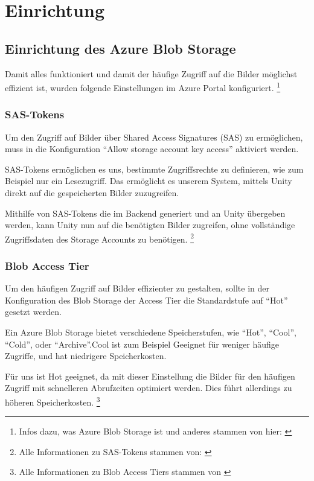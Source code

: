 
\section{Einrichtung}

\subsection{Einrichtung des Azure Blob Storage}

Damit alles funktioniert und damit der häufige Zugriff auf die Bilder
möglichst effizient ist, wurden folgende Einstellungen im Azure Portal
konfiguriert. \footnote{Infos dazu, was Azure Blob Storage ist und anderes stammen von hier: \cite{MicrosoftCorporationd}}

\subsubsection{SAS-Tokens}

Um den Zugriff auf Bilder über Shared Access Signatures (SAS) zu ermöglichen, muss in 
die Konfiguration ``Allow storage account key access'' aktiviert werden.

SAS-Tokens ermöglichen es uns, bestimmte Zugriffsrechte zu definieren, wie zum Beispiel
nur ein Lesezugriff. Das ermöglicht es unserem System, mittels Unity direkt auf die
gespeicherten Bilder zuzugreifen.

Mithilfe von SAS-Tokens die im Backend generiert und an Unity übergeben werden, 
kann Unity nun auf die benötigten Bilder zugreifen, ohne vollständige Zugriffsdaten 
des Storage Accounts zu benötigen. \footnote{Alle Informationen zu SAS-Tokens stammen von: \cite{MicrosoftCorporationa}}


\subsubsection{Blob Access Tier}

Um den häufigen Zugriff auf Bilder effizienter zu gestalten, sollte in der Konfiguration 
des Blob Storage der Access Tier die Standardstufe auf ``Hot'' gesetzt werden.

Ein Azure Blob Storage bietet verschiedene Speicherstufen, wie ``Hot'', ``Cool'', ``Cold'',
oder ``Archive''.Cool ist zum Beispiel Geeignet für weniger häufige Zugriffe, und hat
niedrigere Speicherkosten. 

Für uns ist Hot geeignet, da mit dieser Einstellung die Bilder
für den häufigen Zugriff mit schnelleren Abrufzeiten optimiert werden. Dies führt allerdings
zu höheren Speicherkosten. \footnote{Alle Informationen zu Blob Access Tiers stammen von \cite{MicrosoftCorporationb}}


